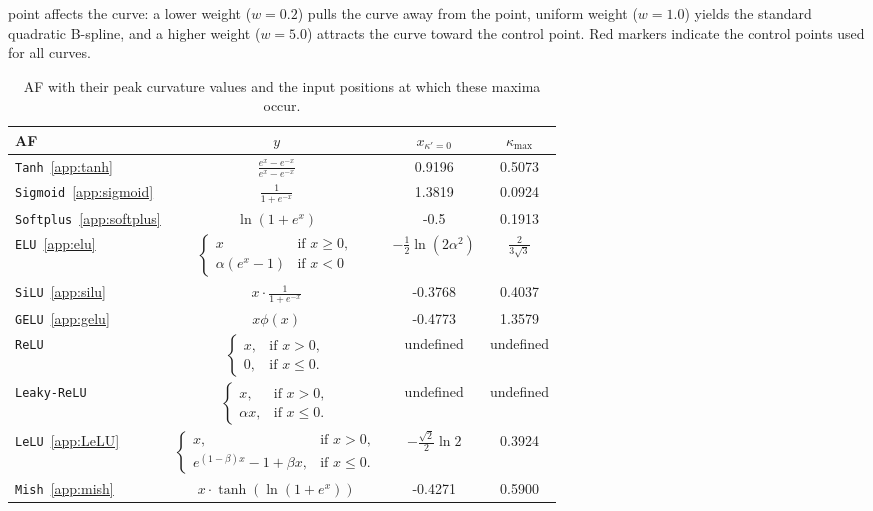 \documentclass[11pt]{article}
\begin{document}
  point affects the curve: a lower weight ($w=0.2$) pulls the curve away 
  from the point, uniform weight ($w=1.0$) yields the standard quadratic B-spline, 
  and a higher weight ($w=5.0$) attracts the curve toward the control point. 
  Red markers indicate the control points used for all curves.
\begin{table}[H]
\centering
\begin{tabular}{l c c c}
\hline
AF & $y$ & $x_{\kappa' = 0}$ & $\kappa_{\text{max}}$\\
\hline
\texttt{Tanh}~\ref{app:tanh} & $\frac{e^{x} - e^{-x}}{e^{x} - e^{-x}}$ & 0.9196 & 0.5073\\
\texttt{Sigmoid}~\ref{app:sigmoid} & $\frac{1}{1 + e^{-x}}$ & 1.3819 & 0.0924\\
\texttt{Softplus}~\ref{app:softplus} & $\ln{({1 + e^{x}})}$ & -0.5 & 0.1913\\
\texttt{ELU}~\ref{app:elu} & $
\begin{cases}
  x & \text{if } x \geq 0, \\
  \alpha (e^x - 1) & \text{if } x < 0
\end{cases}$ & $-\frac{1}{2} \ln(2 \alpha^2)$ & $\frac{2}{3\sqrt3}$\\
\texttt{SiLU}~\ref{app:silu} & $x \cdot \frac{1}{1 + e^{-x}}$ & -0.3768 & 0.4037 \\
\texttt{GELU}~\ref{app:gelu} & $x \phi(x)$ & -0.4773 & 1.3579\\
\texttt{ReLU} & $
\begin{cases}
x, & \text{if } x > 0, \\
0, & \text{if } x \le 0.
\end{cases}$ & undefined & undefined\\
\texttt{Leaky-ReLU} & $
\begin{cases}
x, & \text{if } x > 0, \\
\alpha x, & \text{if } x \le 0.
\end{cases}$ & undefined & undefined\\
\texttt{LeLU}~\ref{app:LeLU} & $
\begin{cases}
x, & \text{if } x > 0, \\
e^{(1 - \beta)x} - 1 + \beta x, & \text{if } x \le 0.
\end{cases}$ & $- \frac{\sqrt{2}}{2}\ln2$ & 0.3924\\
\texttt{Mish}~\ref{app:mish} & $x \cdot \tanh\!\left(\ln(1 + e^{x})\right)$ & -0.4271 & 0.5900\\
\hline
\end{tabular}
\caption{AF with their peak curvature values and the input positions at which these maxima occur.}
\label{tab:AF}
\end{table}
\end{document}
